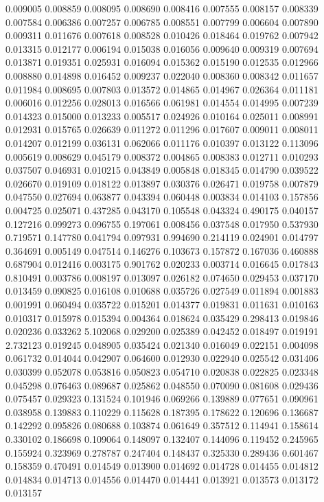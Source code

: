 0.009005
0.008859
0.008095
0.008690
0.008416
0.007555
0.008157
0.008339
0.007584
0.006386
0.007257
0.006785
0.008551
0.007799
0.006604
0.007890
0.009311
0.011676
0.007618
0.008528
0.010426
0.018464
0.019762
0.007942
0.013315
0.012177
0.006194
0.015038
0.016056
0.009640
0.009319
0.007694
0.013871
0.019351
0.025931
0.016094
0.015362
0.015190
0.012535
0.012966
0.008880
0.014898
0.016452
0.009237
0.022040
0.008360
0.008342
0.011657
0.011984
0.008695
0.007803
0.013572
0.014865
0.014967
0.026364
0.011181
0.006016
0.012256
0.028013
0.016566
0.061981
0.014554
0.014995
0.007239
0.014323
0.015000
0.013233
0.005517
0.024926
0.010164
0.025011
0.008991
0.012931
0.015765
0.026639
0.011272
0.011296
0.017607
0.009011
0.008011
0.014207
0.012199
0.036131
0.062066
0.011176
0.010397
0.013122
0.113096
0.005619
0.008629
0.045179
0.008372
0.004865
0.008383
0.012711
0.010293
0.037507
0.046931
0.010215
0.043849
0.005848
0.018345
0.014790
0.039522
0.026670
0.019109
0.018122
0.013897
0.030376
0.026471
0.019758
0.007879
0.047550
0.027694
0.063877
0.043394
0.060448
0.003834
0.014103
0.157856
0.004725
0.025071
0.437285
0.043170
0.105548
0.043324
0.490175
0.040157
0.127216
0.099273
0.096755
0.197061
0.008456
0.037548
0.017950
0.537930
0.719571
0.147780
0.041794
0.097931
0.994690
0.214119
0.024901
0.014797
0.364691
0.005149
0.047514
0.146276
0.103673
0.157872
0.167036
0.460888
0.687904
0.012416
0.003175
0.901762
0.020233
0.003714
0.016645
0.017843
0.810491
0.003786
0.008197
0.013097
0.026182
0.074650
0.029453
0.037170
0.013459
0.090825
0.016108
0.010688
0.035726
0.027549
0.011894
0.001883
0.001991
0.060494
0.035722
0.015201
0.014377
0.019831
0.011631
0.010163
0.010317
0.015978
0.015394
0.004364
0.018624
0.035429
0.298413
0.019846
0.020236
0.033262
5.102068
0.029200
0.025389
0.042452
0.018497
0.019191
2.732123
0.019245
0.048905
0.035424
0.021340
0.016049
0.022151
0.004098
0.061732
0.014044
0.042907
0.064600
0.012930
0.022940
0.025542
0.031406
0.030399
0.052078
0.053816
0.050823
0.054710
0.020838
0.022825
0.023348
0.045298
0.076463
0.089687
0.025862
0.048550
0.070090
0.081608
0.029436
0.075457
0.029323
0.131524
0.101946
0.069266
0.139889
0.077651
0.090961
0.038958
0.139883
0.110229
0.115628
0.187395
0.178622
0.120696
0.136687
0.142292
0.095826
0.080688
0.103874
0.061649
0.357512
0.114941
0.158614
0.330102
0.186698
0.109064
0.148097
0.132407
0.144096
0.119452
0.245965
0.155924
0.323969
0.278787
0.247404
0.148437
0.325330
0.289436
0.601467
0.158359
0.470491
0.014549
0.013900
0.014692
0.014728
0.014455
0.014812
0.014834
0.014713
0.014556
0.014470
0.014441
0.013921
0.013573
0.013172
0.013157
